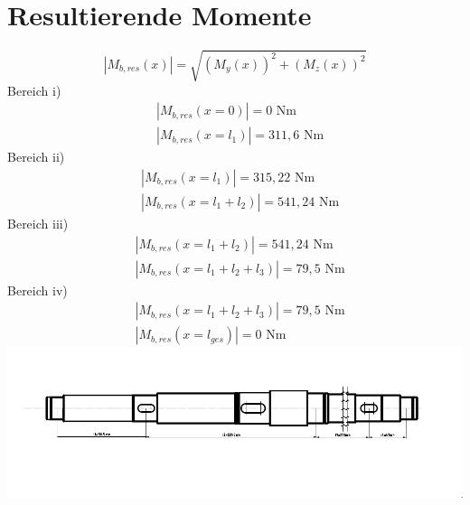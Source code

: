 \section{Resultierende Momente}
\[
	|M_{b,res}(x)| = \sqrt{\left( M_{y}(x) \right)^2 + \left( M_{z}(x) \right)^2 }
\]
Bereich i)
\begin{align*}
	&|M_{b,res}(x=0)| = 0 \text{ Nm} \\
	&|M_{b,res}(x=l_1)| = 311,6 \text{ Nm} 
\end{align*}
Bereich ii)
\begin{align*}
	&|M_{b,res}(x=l_1)| = 315,22 \text{ Nm} \\
	&|M_{b,res}(x=l_1+l_2)| = 541,24 \text{ Nm} 
\end{align*}
Bereich iii)
\begin{align*}
	&|M_{b,res}(x=l_1+l_2)| = 541,24 \text{ Nm} \\
	&|M_{b,res}(x=l_1+l_2+l_3)| = 79,5 \text{ Nm} 
\end{align*}
Bereich iv)
\begin{align*}
	&|M_{b,res}(x=l_1+l_2+l_3)| = 79,5 \text{ Nm} \\
	&|M_{b,res}(x=l_{ges})| = 0 \text{ Nm} 
\end{align*}
\includegraphics[width=\textwidth,keepaspectratio]{figures/Welleklein.png}